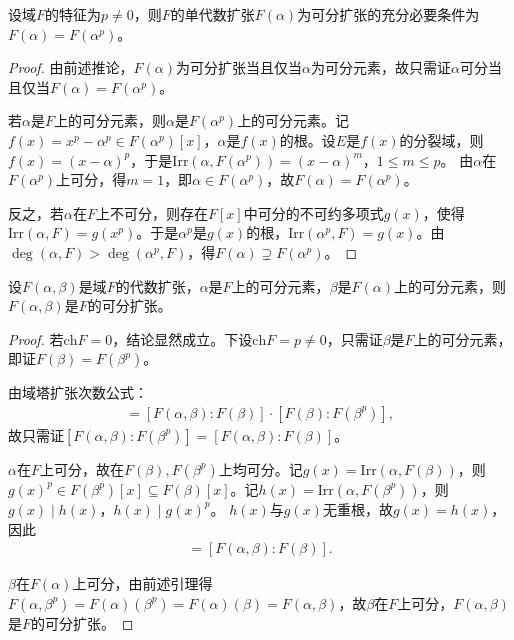 \documentclass[../../main.tex]{subfiles}%
\begin{document}
\begin{lemma}
设域$F$的特征为$p\neq0$，则$F$的单代数扩张$F(\alpha)$为可分扩张的充分必要条件为$F(\alpha)=F(\alpha^p)$。
\end{lemma}
\begin{proof}
由前述推论，$F(\alpha)$为可分扩张当且仅当$\alpha$为可分元素，故只需证$\alpha$可分当且仅当$F(\alpha)=F(\alpha^p)$。

若$\alpha$是$F$上的可分元素，则$\alpha$是$F(\alpha^p)$上的可分元素。记$f(x)=x^p-\alpha^p\in F(\alpha^p)[x]$，$\alpha$是$f(x)$的根。设$E$是$f(x)$的分裂域，则$f(x)=(x-\alpha)^p$，于是$\mathrm{Irr}(\alpha,F(\alpha^p))=(x-\alpha)^m$，$1\leqslant m\leqslant p$。
由$\alpha$在$F(\alpha^p)$上可分，得$m=1$，即$\alpha\in F(\alpha^p)$，故$F(\alpha)=F(\alpha^p)$。

反之，若$\alpha$在$F$上不可分，则存在$F[x]$中可分的不可约多项式$g(x)$，使得$\mathrm{Irr}(\alpha,F)=g(x^p)$。于是$\alpha^p$是$g(x)$的根，$\mathrm{Irr}(\alpha^p,F)=g(x)$。由$\deg(\alpha,F)>\deg(\alpha^p,F)$，得$F(\alpha)\supsetneq F(\alpha^p)$。
\end{proof}

\begin{lemma}
设$F(\alpha,\beta)$是域$F$的代数扩张，$\alpha$是$F$上的可分元素，$\beta$是$F(\alpha)$上的可分元素，则$F(\alpha,\beta)$是$F$的可分扩张。
\end{lemma}
\begin{proof}
若$\mathrm{ch}F=0$，结论显然成立。下设$\mathrm{ch}F=p\neq0$，只需证$\beta$是$F$上的可分元素，即证$F(\beta)=F(\beta^p)$。

由域塔扩张次数公式：
\begin{align*}
[F(\alpha,\beta):F(\beta^p)]=[F(\alpha,\beta):F(\beta)]\cdot[F(\beta):F(\beta^p)],
\end{align*}
故只需证$[F(\alpha,\beta):F(\beta^p)]=[F(\alpha,\beta):F(\beta)]$。

$\alpha$在$F$上可分，故在$F(\beta),F(\beta^p)$上均可分。记$g(x)=\mathrm{Irr}(\alpha,F(\beta))$，则$g(x)^p\in F(\beta^p)[x]\subseteq F(\beta)[x]$。记$h(x)=\mathrm{Irr}(\alpha,F(\beta^p))$，则$g(x)\mid h(x)$，$h(x)\mid g(x)^p$。
$h(x)$与$g(x)$无重根，故$g(x)=h(x)$，因此
\begin{align*}
[F(\alpha,\beta^p):F(\beta^p)]=[F(\alpha,\beta):F(\beta)].
\end{align*}

$\beta$在$F(\alpha)$上可分，由前述引理得$F(\alpha,\beta^p)=F(\alpha)(\beta^p)=F(\alpha)(\beta)=F(\alpha,\beta)$，故$\beta$在$F$上可分，$F(\alpha,\beta)$是$F$的可分扩张。
\end{proof}
\end{document}
